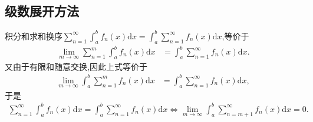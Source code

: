 \documentclass[../../main.tex]{subfiles}
\begin{document}
\subsection{级数展开方法}

积分和求和换序$\sum_{n = 1}^{\infty} \int_{a}^{b} f_n(x) \mathrm{d}x = \int_{a}^{b} \sum_{n = 1}^{\infty} f_n(x) \mathrm{d}x$,等价于
\begin{align*}
\lim_{m \to \infty} \sum_{n = 1}^{m} \int_{a}^{b} f_n(x) \mathrm{d}x &= \int_{a}^{b} \sum_{n = 1}^{\infty} f_n(x) \mathrm{d}x.
\end{align*}
又由于有限和随意交换,因此上式等价于
\begin{align*}
\lim_{m \to \infty} \int_{a}^{b} \sum_{n = 1}^{m} f_n(x) \mathrm{d}x &= \int_{a}^{b} \sum_{n = 1}^{\infty} f_n(x) \mathrm{d}x,
\end{align*}
于是
\begin{align*}
\sum_{n = 1}^{\infty} \int_{a}^{b} f_n(x) \mathrm{d}x = \int_{a}^{b} \sum_{n = 1}^{\infty} f_n(x) \mathrm{d}x \Longleftrightarrow  \lim_{m \to \infty} \int_{a}^{b} \sum_{n = m + 1}^{\infty} f_n(x) \mathrm{d}x = 0.
\end{align*} 
\end{document}
